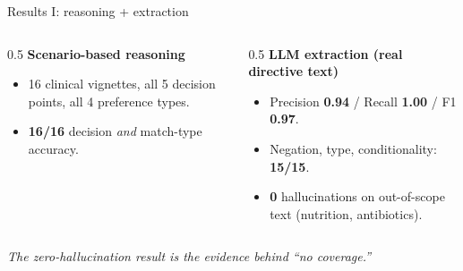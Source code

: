 \documentclass[aspectratio=169,10pt]{beamer}
\newcommand{\hl}[1]{\textcolor{adoblue}{\textbf{#1}}}
\begin{document}
\begin{frame}{Results I: reasoning + extraction}
  \begin{columns}[T]
    \begin{column}{0.5\textwidth}
      \textbf{Scenario-based reasoning}
      \begin{itemize}
        \item 16 clinical vignettes, all 5 decision points, all 4 preference types.
        \item \hl{16/16} decision \emph{and} match-type accuracy.
      \end{itemize}
    \end{column}
    \begin{column}{0.5\textwidth}
      \textbf{LLM extraction (real directive text)}
      \begin{itemize}
        \item Precision \hl{0.94} / Recall \hl{1.00} / F1 \hl{0.97}.
        \item Negation, type, conditionality: \hl{15/15}.
        \item \hl{0} hallucinations on out-of-scope text (nutrition, antibiotics).
      \end{itemize}
    \end{column}
  \end{columns}
  \vspace{0.6em}
  \begin{center}
    \emph{The zero-hallucination result is the evidence behind ``no coverage.''}
  \end{center}
\end{frame}
\end{document}
